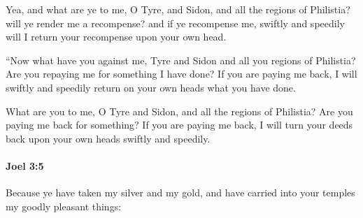 			\begin{versebox}
					\item[BHS] 
					\item[LXX] 
					\item[ASV] Yea, and what are ye to me, O Tyre, and Sidon, and all the regions of Philistia? will ye render me a recompense? and if ye recompense me, swiftly and speedily will I return your recompense upon your own head.
					\item[NIV] “Now what have you against me, Tyre and Sidon and all you regions of Philistia? Are you repaying me for something I have done? If you are paying me back, I will swiftly and speedily return on your own heads what you have done.
					\item[NRSV] What are you to me, O Tyre and Sidon, and all the regions of Philistia? Are you paying me back for something? If you are paying me back, I will turn your deeds back upon your own heads swiftly and speedily.
			\end{versebox}

		\paragraph{Joel 3:5} %
			\label{JOEL-3-5}

			Because ye have taken my silver and my gold, and have carried into your temples my goodly pleasant things:

